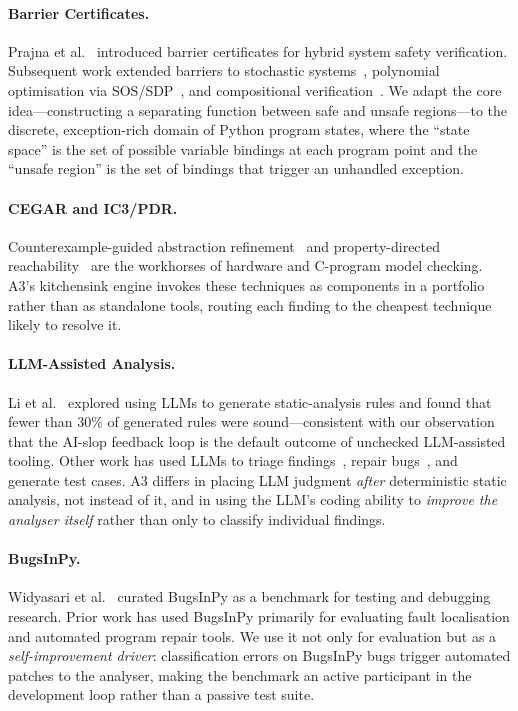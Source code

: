 \documentclass[sigconf,review,anonymous]{acmart}
\begin{document}
\paragraph{Barrier Certificates.}
Prajna et al.~\cite{prajna2004safety,prajna2007framework} introduced barrier certificates for hybrid system safety verification.
Subsequent work extended barriers to stochastic systems~\cite{prajna2007framework}, polynomial optimisation via SOS/SDP~\cite{parrilo2003semidefinite}, and compositional verification~\cite{henzinger1998you}.
We adapt the core idea---constructing a separating function between safe and unsafe regions---to the discrete, exception-rich domain of Python program states, where the ``state space'' is the set of possible variable bindings at each program point and the ``unsafe region'' is the set of bindings that trigger an unhandled exception.

\paragraph{CEGAR and IC3/PDR.}
Counterexample-guided abstraction refinement~\cite{clarke2000counterexample} and property-directed reachability~\cite{bradley2011satbased} are the workhorses of hardware and C-program model checking.
\textsc{A3}'s kitchensink engine invokes these techniques as components in a portfolio rather than as standalone tools, routing each finding to the cheapest technique likely to resolve it.

\paragraph{LLM-Assisted Analysis.}
Li et al.~\cite{llmsa} explored using LLMs to generate static-analysis rules and found that fewer than 30\% of generated rules were sound---consistent with our observation that the AI-slop feedback loop is the default outcome of unchecked LLM-assisted tooling.
Other work has used LLMs to triage findings~\cite{llmtriage}, repair bugs~\cite{llmrepair}, and generate test cases.
\textsc{A3} differs in placing LLM judgment \emph{after} deterministic static analysis, not instead of it, and in using the LLM's coding ability to \emph{improve the analyser itself} rather than only to classify individual findings.

\paragraph{BugsInPy.}
Widyasari et al.~\cite{widyasari2020bugsinpy} curated BugsInPy as a benchmark for testing and debugging research.
Prior work has used BugsInPy primarily for evaluating fault localisation and automated program repair tools.
We use it not only for evaluation but as a \emph{self-improvement driver}: classification errors on BugsInPy bugs trigger automated patches to the analyser, making the benchmark an active participant in the development loop rather than a passive test suite.
\end{document}
